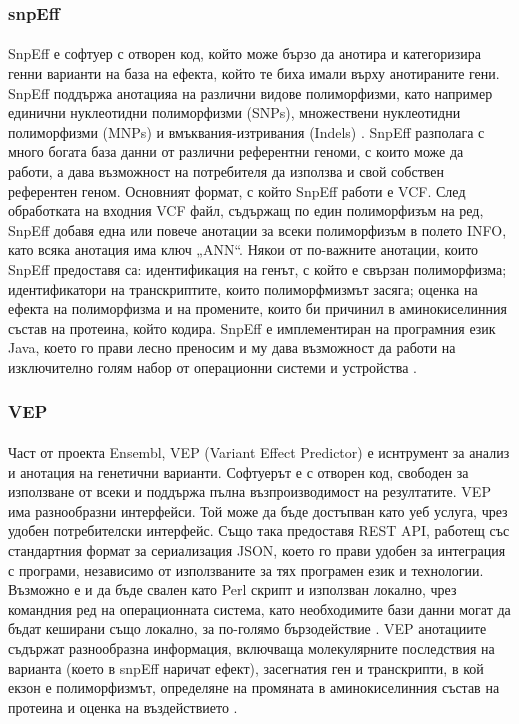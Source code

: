 \documentclass[pdftex,cyrillic,14pt,a4page,twoside,openright]{extreport}
\begin{document}
\subsubsection{snpEff}
\paragraph{}
SnpEff е софтуер с отворен код, който може бързо да анотира и категоризира генни варианти на база на ефекта, който те биха имали върху анотираните гени. SnpEff поддържа анотацияа на различни видове полиморфизми, като например единични нуклеотидни полиморфизми (SNPs), множествени нуклеотидни полиморфизми (MNPs) и вмъквания-изтривания (Indels) \cite{cingolani2012}. SnpEff разполага с много богата база данни от различни референтни геноми, с които може да работи, а дава възможност на потребителя да използва и свой собствен референтен геном. Основният формат, с който SnpEff работи е VCF. След обработката на входния VCF файл, съдържащ по един полиморфизъм на ред, SnpEff добавя една или повече анотации за всеки полиморфизъм в полето INFO, като всяка анотация има ключ „ANN“. Някои от по-важните анотации, които SnpEff предоставя са: идентификация на генът, с който е свързан полиморфизма; идентификатори на транскриптите, които полиморфмизмът засяга; оценка на ефекта на полиморфизма и на промените, които би причинил в аминокиселинния състав на протеина, който кодира. SnpEff е имплементиран на програмния език Java, което го прави лесно преносим и му дава възможност да работи на изключително голям набор от операционни системи и устройства \cite[стр. 9-10]{schildt2020complete}.

\subsubsection{VEP}
\paragraph{}
Част от проекта Ensembl, VEP (Variant Effect Predictor) е иснтрумент за анализ и анотация на генетични варианти. Софтуерът е с отворен код, свободен за използване от всеки и поддържа пълна възпроизводимост на резултатите. VEP има разнообразни интерфейси. Той може да бъде достъпван като уеб услуга, чрез удобен потребителски интерфейс. Също така предоставя REST API, работещ със стандартния формат за сериализация JSON, което го прави удобен за интеграция с програми, независимо от използваните за тях програмен език и технологии. Възможно е и да бъде свален като Perl скрипт и използван локално, чрез командния ред на операционната система, като необходимите бази данни могат да бъдат кеширани също локално, за по-голямо бързодействие \cite{mclaren2016}. VEP анотациите съдържат разнообразна информация, включваща молекулярните последствия на варианта (което в snpEff наричат ефект), засегнатия ген и транскрипти, в кой екзон е полиморфизмът, определяне на промяната в аминокиселинния състав на протеина и оценка на въздействието \cite{hunt2022}.
\end{document}
